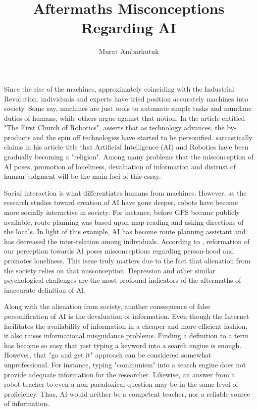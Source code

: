 \documentclass[man]{apa6}
\title{Aftermaths Misconceptions Regarding AI}
\author{Murat Ambarkutuk}
\affiliation{English Language Institute, University of Delaware \\ murata@udel.edu}
\begin{document}
\maketitle
Since the rise of the machines, approximately coinciding with the Industrial Revolution, individuals and experts have tried position accurately machines into society. Some say, machines are just tools to automate simple tasks and mundane duties of humans, while others argue against that notion. In the article entitled "The First Church of Robotics",  asserts that as technology advances, the by-products and the spin off technologies have started to be personified.  sarcastically claims in his article title that Artificial Intelligence (AI)  and Robotics have been gradually becoming a "religion". Among many problems that the misconception of AI poses, promotion of loneliness, devaluation of information and distrust of human judgment will be the main foci of this essay.\par
Social interaction is what differentiates humans from machines. However, as the research studies toward creation of AI have gone deeper, robots have become more socially interactive in society. For instance, before GPS became publicly available, route planning was based upon map-reading and asking directions of the locals. In light of this example, AI has become route planning assistant and has decreased the inter-relation among individuals. According to , reformation of our perception towards AI poses misconceptions regarding person-hood and promotes loneliness. This issue truly matters due to the fact that alienation from the society relies on that misconception. Depression and other similar psychological challenges are the most profound indicators of the aftermaths of inaccurate definition of AI.\par
Along with the alienation from society, another consequence of false personification of AI is the devaluation of information. Even though the Internet facilitates the availability of information in a cheaper and more efficient fashion, it also raises informational misguidance problems. Finding a definition to a term has become so easy that just typing a keyword into a search engine is enough. However, that "go and get it" approach can be considered somewhat unprofessional. For instance, typing "communism" into a search engine does not provide adequate information for the researcher. Likewise, an answer from a robot teacher to even a non-paradoxical question may be in the same level of proficiency. Thus, AI would neither be a competent teacher, nor a reliable source of information.\par
\end{document}
